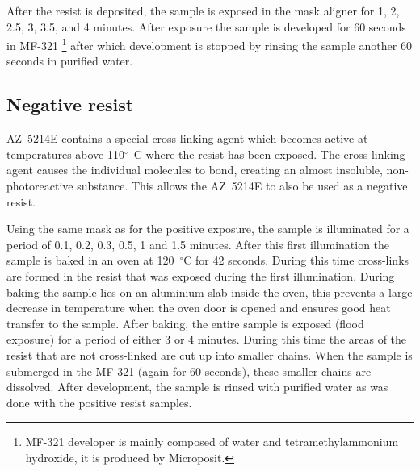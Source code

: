 After the resist is deposited, the sample is exposed in the mask aligner for 1, 2, 2.5, 3, 3.5, and 4 minutes. After exposure the sample is developed for 60 seconds in MF-321 \footnote{MF-321 developer is mainly composed of water and tetramethylammonium hydroxide, it is produced by Microposit.} after which development is stopped by rinsing the sample another 60 seconds in purified water.

\subsection*{Negative resist}
AZ~5214E contains a special cross-linking agent which becomes active at temperatures above 110$^{\circ}$~C where the resist has been exposed. The cross-linking agent causes the individual molecules to bond, creating an almost insoluble, non-photoreactive substance. This allows the AZ~5214E to also be used as a negative resist.

Using the same mask as for the positive exposure, the sample is illuminated for a period of 0.1, 0.2, 0.3, 0.5, 1 and 1.5 minutes. After this first illumination the sample is baked in an oven at 120~$^\circ$C for 42 seconds. During this time cross-links are formed in the resist that was exposed during the first illumination. During baking the sample lies on an aluminium slab inside the oven, this prevents a large decrease in temperature when the oven door is opened and ensures good heat transfer to the sample. After baking, the entire sample is exposed (flood exposure) for a period of either 3 or 4 minutes. During this time the areas of the resist that are not cross-linked are cut up into smaller chains. When the sample is submerged in the MF-321 (again for 60 seconds), these smaller chains are dissolved. After development, the sample is rinsed with purified water as was done with the positive resist samples\cite{productdatasheet}.